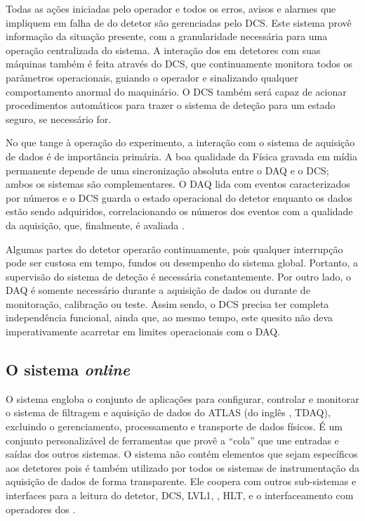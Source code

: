 Todas as ações iniciadas pelo operador e todos os erros, avisos e alarmes que
impliquem em falha de  do detetor são gerenciadas pelo DCS. Este
sistema provê informação  da situação presente, com a
granularidade necessária para uma operação centralizada do sistema. A
interação dos  em detetores com suas máquinas também é feita
através do DCS, que continuamente monitora todos os parâmetros operacionais,
guiando o operador e sinalizando qualquer comportamento anormal do
maquinário. O DCS também será capaz de acionar procedimentos automáticos para
trazer o sistema de deteção para um estado seguro, se necessário for.

No que tange à operação do experimento, a interação com o sistema de aquisição
de dados é de importância primária. A boa qualidade da Física gravada em mídia
permanente depende de uma sincronização absoluta entre o DAQ e o DCS; ambos os
sistemas são complementares. O DAQ lida com eventos caracterizados por números
e o DCS guarda o estado operacional do detetor enquanto os dados estão sendo
adquiridos, correlacionando os números dos eventos com a qualidade da
aquisição, que, finalmente, é avaliada .

Algumas partes do detetor operarão continuamente, pois qualquer interrupção
pode ser custosa em tempo, fundos ou desempenho do sistema global. Portanto, a
supervisão do sistema de deteção é necessária constantemente. Por outro lado,
o DAQ é somente necessário durante a aquisição de dados ou durante 
de monitoração, calibração ou teste. Assim sendo, o DCS precisa ter completa
independência funcional, ainda que, ao mesmo tempo, este quesito não deva
imperativamente acarretar em limites operacionais com o DAQ.

\subsection{O sistema \textit{online}}
\label{sec:online}

O sistema  engloba o conjunto de aplicações para configurar,
controlar e monitorar o sistema de filtragem e aquisição de dados do ATLAS (do
inglês , TDAQ), excluindo o gerenciamento,
processamento e transporte de dados físicos. É um conjunto personalizável de
ferramentas que provê a ``cola'' que une entradas e saídas dos outros
sistemas. O sistema  não contém elementos que sejam específicos
aos detetores pois é também utilizado por todos os sistemas de instrumentação
da aquisição de dados de forma transparente. Ele coopera com outros
sub-sistemas e interfaces para a leitura do detetor, DCS, LVL1,
, HLT,  e o interfaceamento com operadores dos
.

